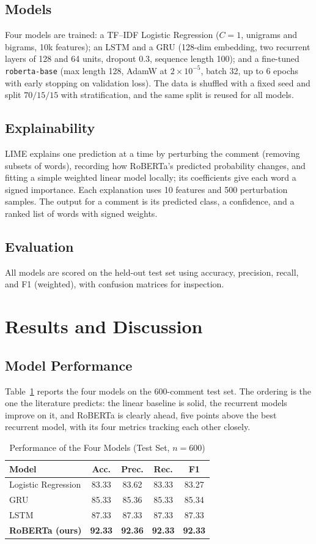 \documentclass[conference]{IEEEtran}
\begin{document}
\subsection{Models}
Four models are trained: a TF--IDF Logistic Regression ($C=1$, unigrams and bigrams, 10k features); an LSTM and a GRU (128-dim embedding, two recurrent layers of 128 and 64 units, dropout 0.3, sequence length 100); and a fine-tuned \texttt{roberta-base} (max length 128, AdamW at $2\times10^{-5}$, batch 32, up to 6 epochs with early stopping on validation loss). The data is shuffled with a fixed seed and split $70/15/15$ with stratification, and the same split is reused for all models.

\subsection{Explainability}
LIME explains one prediction at a time by perturbing the comment (removing subsets of words), recording how RoBERTa's predicted probability changes, and fitting a simple weighted linear model locally; its coefficients give each word a signed importance. Each explanation uses 10 features and 500 perturbation samples. The output for a comment is its predicted class, a confidence, and a ranked list of words with signed weights.

\subsection{Evaluation}
All models are scored on the held-out test set using accuracy, precision, recall, and F1 (weighted), with confusion matrices for inspection.

\section{Results and Discussion}
\subsection{Model Performance}
Table~\ref{tab:results} reports the four models on the 600-comment test set. The ordering is the one the literature predicts: the linear baseline is solid, the recurrent models improve on it, and RoBERTa is clearly ahead, five points above the best recurrent model, with its four metrics tracking each other closely.

\begin{table}[t]
\caption{Performance of the Four Models (Test Set, $n=600$)}
\label{tab:results}
\centering
\begin{tabular}{lcccc}
\toprule
\textbf{Model} & \textbf{Acc.} & \textbf{Prec.} & \textbf{Rec.} & \textbf{F1} \\
\midrule
Logistic Regression & 83.33 & 83.62 & 83.33 & 83.27 \\
GRU & 85.33 & 85.36 & 85.33 & 85.34 \\
LSTM & 87.33 & 87.33 & 87.33 & 87.33 \\
\textbf{RoBERTa (ours)} & \textbf{92.33} & \textbf{92.36} & \textbf{92.33} & \textbf{92.33} \\
\bottomrule
\end{tabular}
\end{table}
\end{document}
